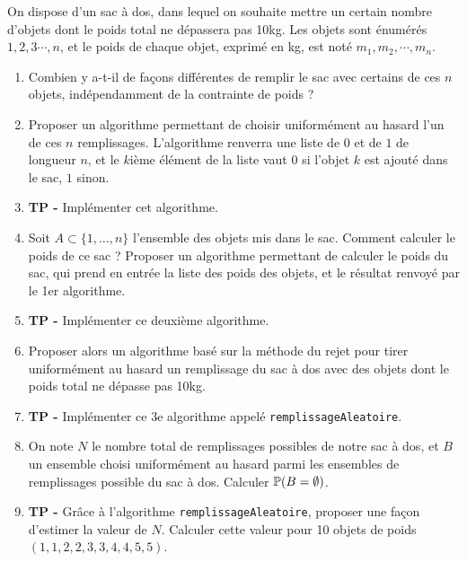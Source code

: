 \documentclass[solutions]{exercices}
\begin{document}
\begin{exercice}
On dispose d'un sac à dos, dans lequel on souhaite mettre un certain nombre d'objets dont le poids total ne dépassera pas 10kg. Les objets sont énumérés $1, 2, 3 \cdots, n$, et le poids de chaque objet, exprimé en kg, est noté $m_1,m_2,\cdots, m_n$.
\begin{enumerate}
  \item Combien y a-t-il de façons différentes de remplir le sac avec certains de ces $n$ objets, indépendamment de la contrainte de poids ?
  \item Proposer un algorithme permettant de choisir uniformément au hasard l'un de ces $n$ remplissages. L'algorithme renverra une liste de $0$ et de $1$ de longueur $n$, et le $k$ième élément de la liste vaut $0$ si l'objet $k$ est ajouté dans le sac, $1$ sinon.
  \item \textbf{TP -} Implémenter cet algorithme.
  \item Soit $A \subset \{1,\ldots,n\}$ l'ensemble des objets mis dans le sac. Comment calculer le poids de ce sac ? Proposer un algorithme permettant de calculer le poids du sac, qui prend en entrée la liste des poids des objets, et le résultat renvoyé par le 1er algorithme.
  \item \textbf{TP -} Implémenter ce deuxième algorithme.
  \item Proposer alors un algorithme basé sur la méthode du rejet pour tirer uniformément au hasard un remplissage du sac à dos avec des objets dont le poids total ne dépasse pas 10kg.
  \item \textbf{TP -} Implémenter ce 3e algorithme appelé \texttt{remplissageAleatoire}.
  \item On note $N$ le nombre total de remplissages possibles de notre sac à dos, et $B$ un ensemble choisi uniformément au hasard parmi les ensembles de remplissages possible du sac à dos. Calculer $\P(B = \emptyset)$.
  \item \textbf{TP -} Grâce à l'algorithme \texttt{remplissageAleatoire}, proposer une façon d'estimer la valeur de $N$. Calculer cette valeur pour 10 objets de poids $(1,1,2,2,3,3,4,4,5,5)$.
\end{enumerate}

\end{exercice}
\end{document}
